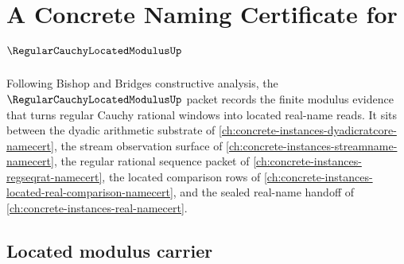 \chapter{A Concrete Naming Certificate for $\RegularCauchyLocatedModulusUp$}
\label{ch:concrete-instances-regular-cauchy-located-modulus-namecert}

Following Bishop and Bridges constructive analysis, the
$\RegularCauchyLocatedModulusUp$ packet records the finite modulus evidence that
turns regular Cauchy rational windows into located real-name reads. It sits
between the dyadic arithmetic substrate of
\autoref{ch:concrete-instances-dyadicratcore-namecert}, the stream observation
surface of \autoref{ch:concrete-instances-streamname-namecert}, the regular
rational sequence packet of
\autoref{ch:concrete-instances-regseqrat-namecert}, the located comparison rows
of \autoref{ch:concrete-instances-located-real-comparison-namecert}, and the
sealed real-name handoff of \autoref{ch:concrete-instances-real-namecert}.

\section{Located modulus carrier}
\label{sec:regular-cauchy-located-modulus-carrier}

